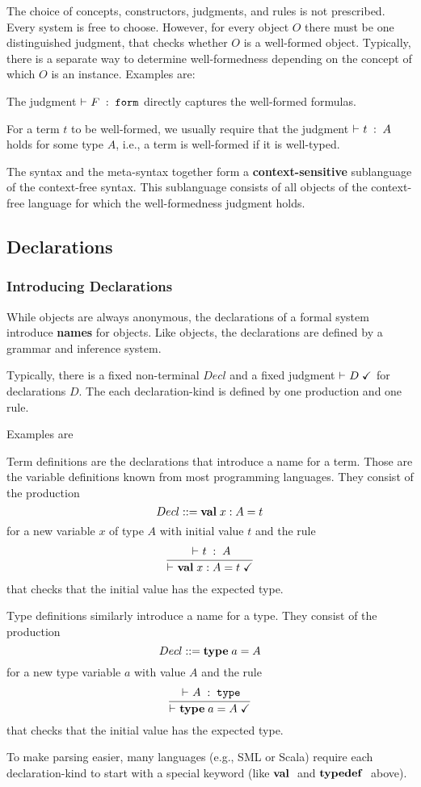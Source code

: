 The choice of concepts, constructors, judgments, and rules is not prescribed.
Every system is free to choose.
However, for every object $O$ there must be one distinguished judgment, that checks whether $O$ is a well-formed object.
Typically, there is a separate way to determine well-formedness depending on the concept of which $O$ is an instance.
Examples are:
\begin{compactitem}
 \item The judgment $\vdash^{}_{}F\;:\;\mathtt{form}$ directly captures the well-formed formulas.
 \item For a term $t$ to be well-formed, we usually require that the judgment $\vdash^{}_{}t\;:\;A$ holds for some type $A$, i.e., a term is well-formed if it is well-typed.
\end{compactitem}

The syntax and the meta-syntax together form a \textbf{context-sensitive} sublanguage of the context-free syntax.
This sublanguage consists of all objects of the context-free language for which the well-formedness judgment holds.

\subsection{Declarations}

\subsubsection{Introducing Declarations}

While objects are always anonymous, the declarations of a formal system introduce \textbf{names} for objects.
Like objects, the declarations are defined by a grammar and inference system.

Typically, there is a fixed non-terminal $Decl$ and a fixed judgment $\vdash^{}_{}D\;\checkmark$ for declarations $D$.
The each declaration-kind is defined by one production and one rule.

Examples are
\begin{compactitem}
 \item Term definitions are the declarations that introduce a name for a term.
 Those are the variable definitions known from most programming languages.
 They consist of the production
  \[Decl ::= \aval{x}{A}{t}\]
  for a new variable $x$ of type $A$ with initial value $t$
  and the rule
  \[\rul{\oftype{}{}{t}{A}}{\isdecl{}{}{\aval{x}{A}{t}}}\]
  that checks that the initial value has the expected type.
 \item Type definitions similarly introduce a name for a type.
 They consist of the production
  \[Decl ::= \atypedef{a}{A}\]
  for a new type variable $a$ with value $A$
  and the rule
  \[\rul{\oftype{}{}{A}{\type}}{\isdecl{}{}{\atypedef{a}{A}}}\]
  that checks that the initial value has the expected type.
\end{compactitem}
To make parsing easier, many languages (e.g., SML or Scala) require each declaration-kind to start with a special keyword (like ${\rm \bf val}\;$ and ${\rm \bf typedef}\;$ above).

